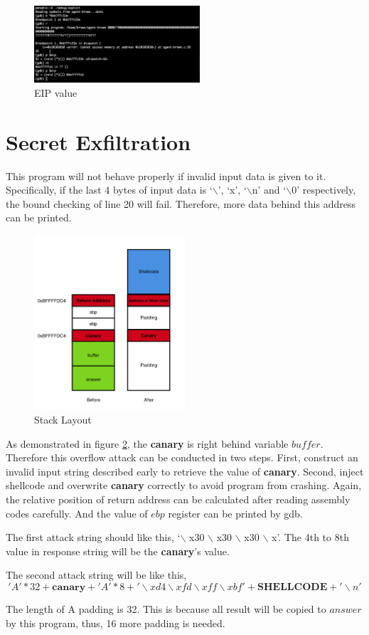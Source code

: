 \documentclass{article}
\begin{document}
\begin{figure}[h]
\centering
\includegraphics[width=0.55\textwidth]{gdb4.png}
\caption{\label{fig:gdb4}EIP value}
\end{figure}

\newpage
\section{Secret Exfiltration}

This program will not behave properly if invalid input data is given to it. Specifically, if the last 4 bytes of input data is `$\backslash$', `x', `$\backslash$n' and `$\backslash$0' respectively, the bound checking of line 20 will fail. Therefore, more data behind this address can be printed.

\begin{figure}[h]
\centering
\includegraphics[width=0.5\textwidth]{stack4.png}
\caption{\label{fig:stack4}Stack Layout}
\end{figure}

As demonstrated in figure \ref{fig:stack4}, the \textbf{canary} is right behind variable $buffer$. Therefore this overflow attack can be conducted in two steps. First, construct an invalid input string described early to retrieve the value of \textbf{canary}. Second, inject shellcode and overwrite \textbf{canary} correctly to avoid program from crashing. Again, the relative position of return address can be calculated after reading assembly codes carefully. And the value of $ebp$ register can be printed by gdb.

The first attack string should like this, `$\backslash$ x30 $\backslash$ x30 $\backslash$ x30 $\backslash$ x'. The 4th to 8th value in response string will be the \textbf{canary}'s value.

The second attack string will be like this,
\[
 'A' * 32 + \textbf{canary} +  'A' * 8 + '\backslash xd4 \backslash xfd \backslash xff \backslash xbf' + \textbf{SHELLCODE} + '\backslash n'
 \]

The length of A padding is 32. This is because all result will be copied to $answer$ by this program, thus, 16 more padding is needed.
\end{document}
